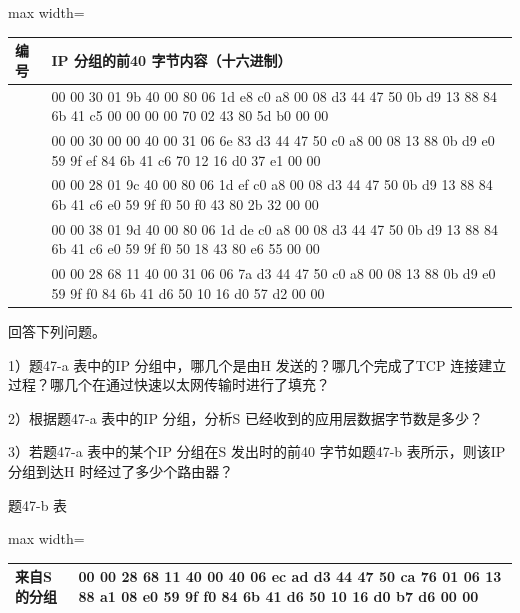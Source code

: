 \documentclass[UTF8,11pt]{ctexart}
\begin{document}
\begin{center}\begin{adjustbox}{max width=\linewidth}\begin{tabular}{|>{\raggedright\arraybackslash}p{\dimexpr(\linewidth-4\tabcolsep-3\arrayrulewidth)/2\relax}|>{\raggedright\arraybackslash}p{\dimexpr(\linewidth-4\tabcolsep-3\arrayrulewidth)/2\relax}|}\hline
编号 & IP 分组的前40 字节内容（十六进制）\\\hline
1 & 45 00 00 30 01 9b 40 00 80 06 1d e8 c0 a8 00 08 d3 44 47 50 0b d9 13 88 84 6b 41 c5 00 00 00 00 70 02 43 80 5d b0 00 00\\\hline
2 & 43 00 00 30 00 00 40 00 31 06 6e 83 d3 44 47 50 c0 a8 00 08 13 88 0b d9 e0 59 9f ef 84 6b 41 c6 70 12 16 d0 37 e1 00 00\\\hline
3 & 45 00 00 28 01 9c 40 00 80 06 1d ef c0 a8 00 08 d3 44 47 50 0b d9 13 88 84 6b 41 c6 e0 59 9f f0 50 f0 43 80 2b 32 00 00\\\hline
4 & 45 00 00 38 01 9d 40 00 80 06 1d de c0 a8 00 08 d3 44 47 50 0b d9 13 88 84 6b 41 c6 e0 59 9f f0 50 18 43 80 e6 55 00 00\\\hline
5 & 45 00 00 28 68 11 40 00 31 06 06 7a d3 44 47 50 c0 a8 00 08 13 88 0b d9 e0 59 9f f0 84 6b 41 d6 50 10 16 d0 57 d2 00 00\\\hline\end{tabular}\end{adjustbox}\end{center}

回答下列问题。


1）题47-a 表中的IP 分组中，哪几个是由H 发送的？哪几个完成了TCP 连接建立过程？哪几个在通过快速以太网传输时进行了填充？


2）根据题47-a 表中的IP 分组，分析S 已经收到的应用层数据字节数是多少？


3）若题47-a 表中的某个IP 分组在S 发出时的前40 字节如题47-b 表所示，则该IP 分组到达H 时经过了多少个路由器？


题47-b 表


\begin{center}\begin{adjustbox}{max width=\linewidth}\begin{tabular}{|>{\raggedright\arraybackslash}p{\dimexpr(\linewidth-4\tabcolsep-3\arrayrulewidth)/2\relax}|>{\raggedright\arraybackslash}p{\dimexpr(\linewidth-4\tabcolsep-3\arrayrulewidth)/2\relax}|}\hline
来自S 的分组 & 45 00 00 28 68 11 40 00 40 06 ec ad d3 44 47 50 ca 76 01 06 13 88 a1 08 e0 59 9f f0 84 6b 41 d6 50 10 16 d0 b7 d6 00 00\\\hline\end{tabular}\end{adjustbox}\end{center}
\end{document}
